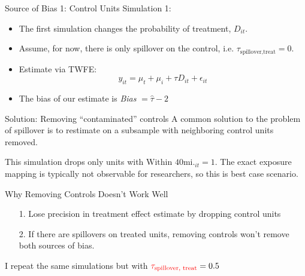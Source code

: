 \documentclass[aspectratio=169]{beamer}
\begin{document}
\begin{frame}{Source of Bias 1: Control Units}
    Simulation 1: 
    
    \begin{itemize}
        \item The first simulation changes the probability of treatment, $D_{it}$.
        
        \item Assume, for now, there is only spillover on the control, i.e. $\tau_{\text{spillover,treat}} = 0$.
        
        \item Estimate via TWFE: \begin{equation*}
            y_{it} = \mu_t + \mu_i + \tau D_{it} + \epsilon_{it}    
        \end{equation*}
        
        \item The bias of our estimate is \textit{Bias} $= \hat{\tau} - 2$
    \end{itemize}


    
\end{frame}



\begin{frame}{Solution: Removing ``contaminated'' controls}
    A common solution to the problem of spillover is to restimate on a subsample with neighboring control units removed.

    This simulation drops only units with $\text{Within 40mi.}_{it} = 1$. The exact exposure mapping is typically not observable for researchers, so this is best case scenario.
\end{frame}


\begin{frame}{Why Removing Controls Doesn't Work Well}
    \begin{itemize}
        \item[1.] Lose precision in treatment effect estimate by dropping control units
        \item[2.] If there are spillovers on treated units, removing controls won't remove both sources of bias. 
    \end{itemize}

    I repeat the same simulations but with $\textcolor{red}{\tau_{\text{spillover, treat}}} = 0.5$
    
\end{frame}
\end{document}
